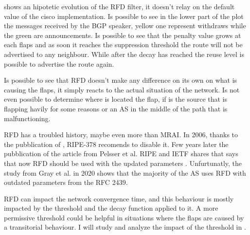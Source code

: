  shows an hipotetic evolution of the \ac{RFD} filter,
it doesn't relay on the default value of the cisco implementation.
Is possible to see in the lower part of the plot the messages received by the
\ac{BGP} speaker, yellow one represent withdraws while the green are announcements.
Is possible to see that the penalty value grows at each flaps and as soon it reaches
the suppression threshold the route will not be advertised to any neighbour.
While after the decay has reached the reuse level is possible to advertise the
route again.

Is possible to see that \ac{RFD} doesn't make any difference on its own on what
is causing the flaps, it simply reacts to the actual situation of the network.
Is not even possible to determine where is located the flap, if is the source
that is flapping havily for some reasons or an \ac{AS} in the middle of the
path that is malfunctioning.

\ac{RFD} has a troubled history, maybe even more than \ac{MRAI}.
In \num{2006}, thanks to the pubblication of \cite{mao2002route}, RIPE-378
\cite{smith2006ripe} recomends to disable it.
Few years later the pubblication of the article from Pelsser et al. \cite{pelsser2011route}
RIPE and IETF shares that says that now \ac{RFD} should be used with the updated
parameters \cite{bush2013ripe,rfc7196}.
Unfurtunatly, the study from Gray et al. \cite{gray2020bgp} in \num{2020} shows
that the majority of the \ac{AS} uses \ac{RFD} with outdated parameters 
from the \ac{RFC} {2439}.

\ac{RFD} can impact the network convergence time, and this behaviour is 
mostly impacted by the threshold and the decay function applied to it.
A more permissive threshold could be helpful in situations where the flaps are
caused by a transitorial behaviour.
I will study and analyze the impact of the threshold in .


